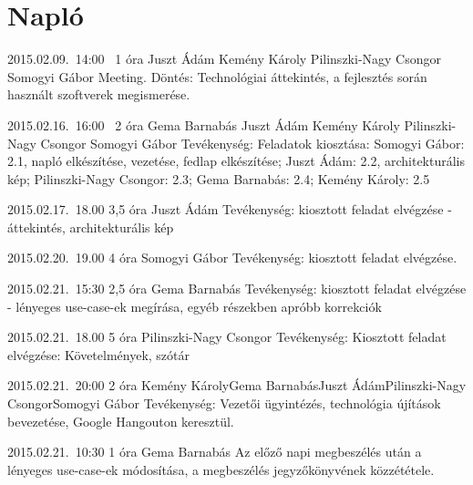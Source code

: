 %
\section{Napló}

\begin{naplo}

\bejegyzes
{2015.02.09.~14:00~} %
{1 óra} %
{Juszt Ádám\newline
Kemény Károly\newline
Pilinszki-Nagy Csongor\newline
Somogyi Gábor} %
{Meeting. Döntés: Technológiai áttekintés, a fejlesztés során használt szoftverek megismerése.} %

\bejegyzes
{2015.02.16.~16:00~}
{2 óra}
{Gema Barnabás\newline
	Juszt Ádám\newline
	Kemény Károly\newline
	Pilinszki-Nagy Csongor\newline
	Somogyi Gábor} %
{Tevékenység: Feladatok kiosztása: Somogyi Gábor: 2.1, napló elkészítése, vezetése, fedlap elkészítése; Juszt Ádám: 2.2, architekturális kép; Pilinszki-Nagy Csongor: 2.3; Gema Barnabás: 2.4; Kemény Károly: 2.5}

\bejegyzes
{2015.02.17.~18.00}
{3,5 óra}
{Juszt Ádám}
{Tevékenység: kiosztott feladat elvégzése - áttekintés, architekturális kép}

\bejegyzes
{2015.02.20.~19.00}
{4 óra}
{Somogyi Gábor}
{Tevékenység: kiosztott feladat elvégzése.}

\bejegyzes
{2015.02.21.~15:30}
{2,5 óra}
{Gema Barnabás}
{Tevékenység: kiosztott feladat elvégzése - lényeges use-case-ek megírása, egyéb részekben apróbb korrekciók}

\bejegyzes
{2015.02.21.~18.00}
{5 óra}
{Pilinszki-Nagy Csongor}
{Tevékenység: \newline Kiosztott feladat elvégzése: Követelmények, szótár}

\bejegyzes
{2015.02.21.~20:00}
{2 óra}
{Kemény Károly\newline Gema Barnabás\newline Juszt Ádám\newline Pilinszki-Nagy Csongor\newline Somogyi Gábor}
{Tevékenység: Vezetői ügyintézés, technológia újítások bevezetése, Google Hangouton keresztül.}

\bejegyzes
{2015.02.21.~10:30}
{1 óra}
{Gema Barnabás}
{Az előző napi megbeszélés után a lényeges use-case-ek módosítása, a megbeszélés jegyzőkönyvének közzététele.}


\end{naplo}

